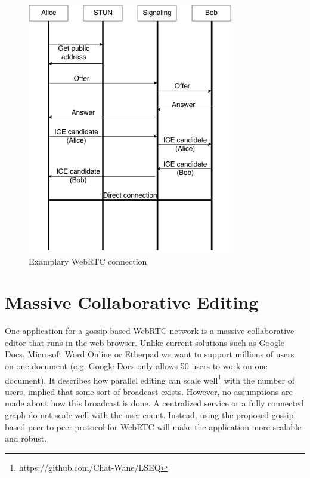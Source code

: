 \documentclass[11pt, english, screen]{report-rd-info}
\begin{document}
\begin{figure}
    \centering
    \includegraphics[width=9cm]{Images/WebRTC}
    \caption{Examplary WebRTC connection}
    \label{fig:webrtc}
\end{figure}

\section{Massive Collaborative Editing}

One application for a gossip-based WebRTC network is a massive collaborative editor \cite{nedelec:hal-00921633} that runs in the web browser.
Unlike current solutions such as Google Docs, Microsoft Word Online or Etherpad we want to support millions of users on one document (e.g. Google Docs only allows 50 users to work on one document).
It describes how parallel editing can scale well\footnote{https://github.com/Chat-Wane/LSEQ} with the number of users, implied that some sort of broadcast exists.
However, no assumptions are made about how this broadcast is done.
A centralized service or a fully connected graph do not scale well with the user count.
Instead, using the proposed gossip-based peer-to-peer protocol for WebRTC will make the application more scalable and robust.


\end{document}
